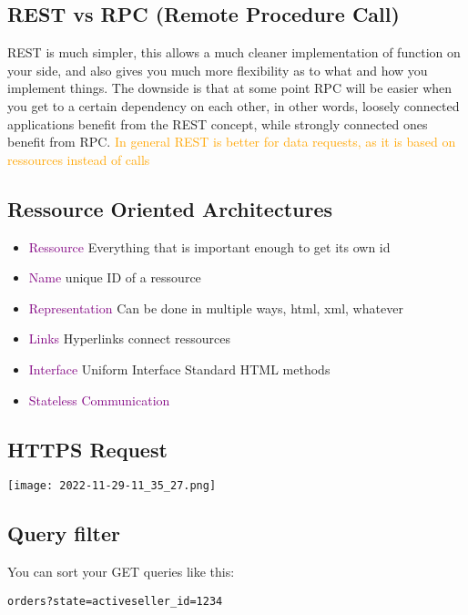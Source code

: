 \documentclass[main.tex,fontsize=6pt,paper=a4,paper=landscape,DIV=calc,]{scrartcl}
\begin{document}
\begin{multicols*}{4}
\subsection{REST vs RPC (Remote Procedure Call)}  
REST is much simpler, this allows a much cleaner implementation of function on your side, and also gives you much more flexibility as to what and how you implement things. \newline
The downside is that at some point RPC will be easier when you get to a certain dependency on each other, in other words, loosely connected applications benefit from the REST concept, while strongly connected ones benefit from RPC.\newline 
\textcolor{orange}{In general REST is better for data requests, as it is based on ressources instead of calls}

\subsection{Ressource Oriented Architectures}  

\begin{itemize}
\item \textcolor{purple}{Ressource}\newline
  Everything that is important enough to get its own id
\item \textcolor{purple}{Name}\newline
  unique ID of a ressource
\item \textcolor{purple}{Representation}\newline
  Can be done in multiple ways, html, xml, whatever
\item \textcolor{purple}{Links}\newline
  Hyperlinks connect ressources
\item \textcolor{purple}{Interface}\newline
  Uniform Interface\newline
  Standard HTML methods
\item \textcolor{purple}{Stateless Communication}
\end{itemize} 

\subsection{HTTPS Request}  
\texttt{[image: 2022-11-29-11\_35\_27.png]}

\subsection{Query filter}  
You can sort your GET queries like this: \newline
\vspace{-2mm}
\begin{lstlisting}
orders?state=activeseller_id=1234
\end{lstlisting}
\vspace{2mm}


\end{multicols*}
\end{document}
